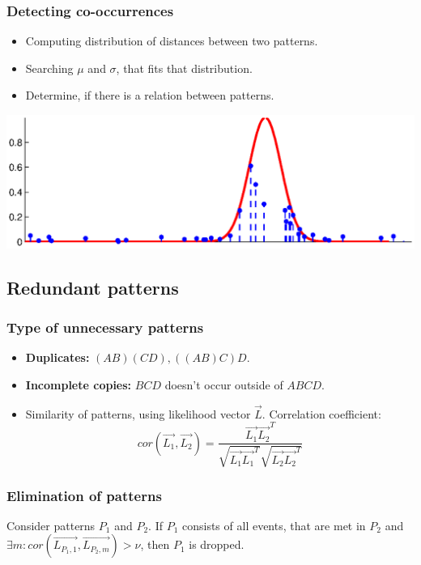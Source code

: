 \documentclass[smaller]{beamer}
\begin{document}
\begin{frame}
  \frametitle{Detecting co-occurrences }
\begin{itemize}
  \item Computing distribution of distances between two patterns.
  \item Searching $\mu$ and $\sigma$, that fits that distribution.
  \item Determine, if there is a relation between patterns.
\end{itemize}
  \includegraphics[scale=0.4]{weights.eps}
\end{frame}

\subsection{ Redundant patterns }
\begin{frame}
  \frametitle{Type of unnecessary patterns}
\begin{itemize}
  \item {\bf Duplicates: } $(AB)(CD), ((AB)C)D$.
  \item {\bf Incomplete copies: } $BCD$ doesn't occur outside of 
				  $ABCD$.
  \item Similarity of patterns, using likelihood vector $\overrightarrow{L}$. Correlation coefficient:
  $$
  cor(\overrightarrow{L_1}, \overrightarrow{L_2}) = \frac{\overrightarrow{L_1}\overrightarrow{L_2}^T}
  {\sqrt{\overrightarrow{L_1}\overrightarrow{L_1}^T}\sqrt{\overrightarrow{L_2}\overrightarrow{L_2}^T}}
  $$
\end{itemize}
\end{frame}

\begin{frame}
  \frametitle{ Elimination of patterns }
  Consider patterns $P_1$ and $P_2$.
  If $P_1$ consists of all events, that are met in $P_2$ and  
  $\exists m: cor(\overrightarrow{L_{P_1,1}}, \overrightarrow{L_{P_2,m}}) > \nu$, then
  $P_1$ is dropped.
\end{frame}
\end{document}
